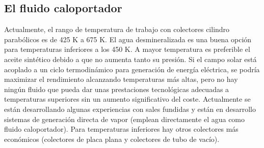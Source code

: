 \subsection{El fluido caloportador}
\label{fluidocaloportador}

Actualmente, el rango de temperatura de trabajo con colectores cilindro parabólicos es de 425 K a 675 K.  El agua desmineralizada es una buena opción para temperaturas inferiores a los 450 K. A mayor temperatura es preferible el aceite sintético debido a que no aumenta tanto su presión. Si el campo solar está acoplado a un ciclo termodinámico para generación de energía eléctrica, se podría maximizar el rendimiento alcanzando temperaturas más altas, pero no hay ningún fluido que pueda dar unas prestaciones tecnológicas adecuadas a temperaturas superiores sin un aumento significativo del coste. Actualmente se están desarrollando algunas experiencias con sales fundidas y están en desarrollo sistemas de generación directa de vapor (emplean directamente el agua como fluido caloportador). Para temperaturas inferiores hay otros colectores más económicos (colectores de placa plana y colectores de tubo de vacío). 
